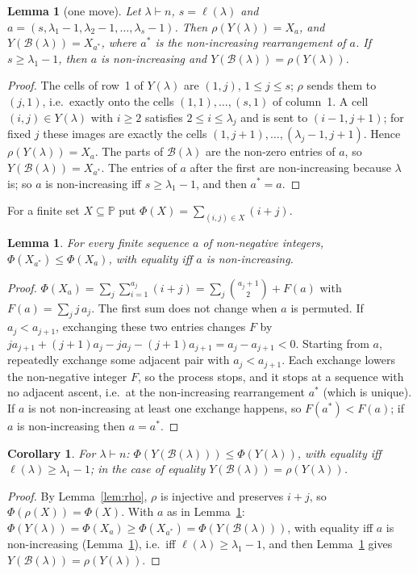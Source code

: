 \documentclass[11pt]{article}
\newtheorem{lemma}[theorem]{Lemma}
\newtheorem{corollary}[theorem]{Corollary}
\theoremstyle{definition}
\newcommand{\PP}{\mathbb{P}}
\newcommand{\B}{\mathcal{B}}
\renewcommand{\le}{\leqslant}
\renewcommand{\ge}{\geqslant}
\begin{document}
\begin{lemma}[one move]\label{lem:move}
Let $\lambda\vdash n$, $s=\ell(\lambda)$ and $a=(s,\lambda_1-1,\lambda_2-1,\dots,\lambda_s-1)$.
Then $\rho(Y(\lambda))=X_a$, and $Y(\B(\lambda))=X_{a^*}$, where $a^*$ is the non-increasing rearrangement
of $a$.  If $s\ge\lambda_1-1$, then $a$ is non-increasing and $Y(\B(\lambda))=\rho(Y(\lambda))$.
\end{lemma}
\begin{proof}
The cells of row~1 of $Y(\lambda)$ are $(1,j)$, $1\le j\le s$; $\rho$ sends them to $(j,1)$, i.e.\ exactly
onto the cells $(1,1),\dots,(s,1)$ of column~1.  A cell $(i,j)\in Y(\lambda)$ with $i\ge 2$ satisfies
$2\le i\le\lambda_j$ and is sent to $(i-1,j+1)$; for fixed $j$ these images are exactly the cells
$(1,j+1),\dots,(\lambda_j-1,j+1)$.  Hence $\rho(Y(\lambda))=X_a$.  The parts of $\B(\lambda)$ are the non-zero
entries of $a$, so $Y(\B(\lambda))=X_{a^*}$.  The entries of $a$ after the first are non-increasing because
$\lambda$ is; so $a$ is non-increasing iff $s\ge\lambda_1-1$, and then $a^*=a$.
\end{proof}

For a finite set $X\subseteq\PP$ put $\Phi(X)=\sum_{(i,j)\in X}(i+j)$.

\begin{lemma}\label{lem:rearr}
For every finite sequence $a$ of non-negative integers, $\Phi(X_{a^*})\le\Phi(X_a)$, with equality iff $a$
is non-increasing.
\end{lemma}
\begin{proof}
$\Phi(X_a)=\sum_j\sum_{i=1}^{a_j}(i+j)=\sum_j\binom{a_j+1}{2}+F(a)$ with $F(a)=\sum_j j\,a_j$.
The first sum does not change when $a$ is permuted.  If $a_j<a_{j+1}$, exchanging these two entries
changes $F$ by $j a_{j+1}+(j+1)a_j-ja_j-(j+1)a_{j+1}=a_j-a_{j+1}<0$.  Starting from $a$, repeatedly exchange
some adjacent pair with $a_j<a_{j+1}$.  Each exchange lowers the non-negative integer $F$, so the process
stops, and it stops at a sequence with no adjacent ascent, i.e.\ at the non-increasing rearrangement
$a^*$ (which is unique).  If $a$ is not non-increasing at least one exchange happens, so $F(a^*)<F(a)$; if
$a$ is non-increasing then $a=a^*$.
\end{proof}

\begin{corollary}\label{cor:energy}
For $\lambda\vdash n$: $\Phi(Y(\B(\lambda)))\le\Phi(Y(\lambda))$, with equality iff $\ell(\lambda)\ge\lambda_1-1$;
in the case of equality $Y(\B(\lambda))=\rho(Y(\lambda))$.
\end{corollary}
\begin{proof}
By Lemma~\ref{lem:rho}, $\rho$ is injective and preserves $i+j$, so $\Phi(\rho(X))=\Phi(X)$.  With $a$ as in
Lemma~\ref{lem:move}: $\Phi(Y(\lambda))=\Phi(X_a)\ge\Phi(X_{a^*})=\Phi(Y(\B(\lambda)))$, with equality iff $a$ is
non-increasing (Lemma~\ref{lem:rearr}), i.e.\ iff $\ell(\lambda)\ge\lambda_1-1$, and then
Lemma~\ref{lem:move} gives $Y(\B(\lambda))=\rho(Y(\lambda))$.
\end{proof}
\end{document}
